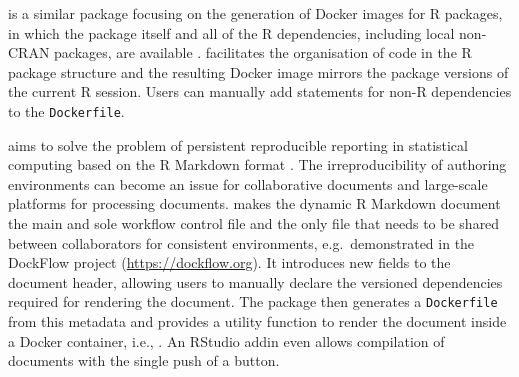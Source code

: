 \textbf{} is a similar package focusing on the generation
of Docker images for R packages, in which the package itself and all of
the R dependencies, including local non-CRAN packages, are available
\citep{cran_dockr,kjeldgaard_dockr_2019}.  facilitates the
organisation of code in the R package structure and the resulting Docker
image mirrors the package versions of the current R session. Users can
manually add statements for non-R dependencies to the
\texttt{Dockerfile}.

\textbf{} \citep{liftr2019} aims to solve the problem of
persistent reproducible reporting in statistical computing based on the
R Markdown format \citep{xie2018}. The irreproducibility of authoring
environments can become an issue for collaborative documents and
large-scale platforms for processing documents.  makes the
dynamic R Markdown document the main and sole workflow control file and
the only file that needs to be shared between collaborators for
consistent environments, e.g.~demonstrated in the DockFlow project
(\url{https://dockflow.org}). It introduces new fields to the document
header, allowing users to manually declare the versioned dependencies
required for rendering the document. The package then generates a
\texttt{Dockerfile} from this metadata and provides a utility function
to render the document inside a Docker container, i.e.,
. An RStudio addin even allows
compilation of documents with the single push of a button.

